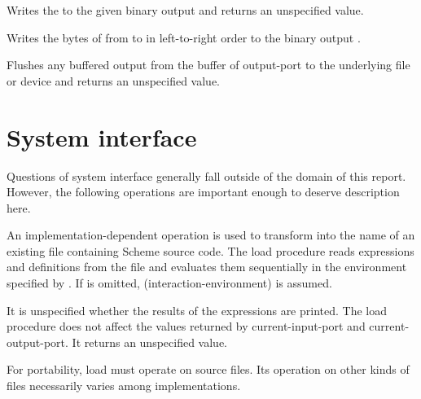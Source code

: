 \begin{entry}{%
}

Writes the  to
the given binary output  and returns an unspecified value.

\end{entry}

\begin{entry}{%
}

Writes the bytes of 
from  to 
in left-to-right order to the
binary output .

\end{entry}

\begin{entry}{%
}

Flushes any buffered output from the buffer of output-port to the
underlying file or device and returns an unspecified value.

\end{entry}


\section{System interface}

Questions of system interface generally fall outside of the domain of this
report.  However, the following operations are important enough to
deserve description here.


\begin{entry}{%
}

An implementation-dependent operation is used to transform
 into the name of an existing file
containing Scheme source code.  The {\cf load} procedure reads
expressions and definitions from the file and evaluates them
sequentially in the environment specified by .
If  is omitted, {\cf (interaction-environment)}
is assumed.

It is unspecified whether the results of the expressions
are printed.  The {\cf load} procedure does not affect the values
returned by {\cf current-input-port} and {\cf current-output-port}.
It returns an unspecified value.


\begin{rationale}
For portability, {\cf load} must operate on source files.
Its operation on other kinds of files necessarily varies among
implementations.
\end{rationale}
\end{entry}

